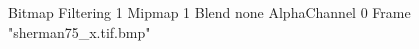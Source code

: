 {Bitmap
	{Filtering 1}
	{Mipmap 1}
	{Blend none}
	{AlphaChannel 0}
	{Frame "sherman75_x.tif.bmp"}
}

